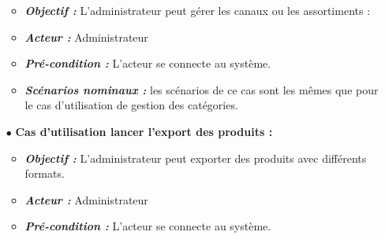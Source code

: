 \begin{itemize}
\medskip
\begin{itemize}
    \item \textit{\textbf{Objectif :}} L’administrateur peut gérer les canaux ou les assortiments :

    \item \textit{\textbf{Acteur :}} Administrateur

    \item \textit{\textbf{Pré-condition  :}} L’acteur se connecte au système. 

    \item \textit{\textbf{Scénarios nominaux :}} les scénarios de ce cas sont les mêmes que pour le cas d'utilisation de gestion des catégories.
    \end{itemize}
        \bigskip
\item[$\bullet$] \textbf{Cas d’utilisation lancer l'export des produits :} 

\medskip
    \begin{itemize}
    \item \textit{\textbf{Objectif :}} L’administrateur peut exporter des produits avec différents formats.

    \item \textit{\textbf{Acteur :}} Administrateur

    \item \textit{\textbf{Pré-condition  :}} L’acteur se connecte au système. 


\end{itemize}
\end{itemize}
